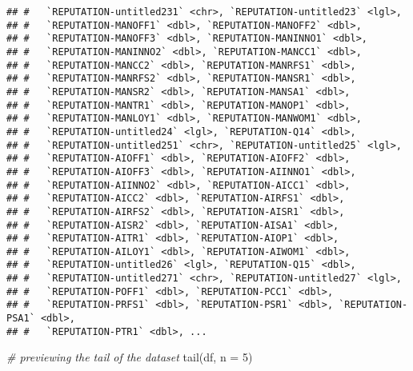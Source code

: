 \documentclass[
]{article}
\newenvironment{Shaded}{\begin{snugshade}}{\end{snugshade}}
\newcommand{\AttributeTok}[1]{\textcolor[rgb]{0.77,0.63,0.00}{#1}}
\newcommand{\CommentTok}[1]{\textcolor[rgb]{0.56,0.35,0.01}{\textit{#1}}}
\newcommand{\DecValTok}[1]{\textcolor[rgb]{0.00,0.00,0.81}{#1}}
\newcommand{\FunctionTok}[1]{\textcolor[rgb]{0.00,0.00,0.00}{#1}}
\newcommand{\NormalTok}[1]{#1}
\begin{document}
\begin{verbatim}
## #   `REPUTATION-untitled231` <chr>, `REPUTATION-untitled23` <lgl>,
## #   `REPUTATION-MANOFF1` <dbl>, `REPUTATION-MANOFF2` <dbl>,
## #   `REPUTATION-MANOFF3` <dbl>, `REPUTATION-MANINNO1` <dbl>,
## #   `REPUTATION-MANINNO2` <dbl>, `REPUTATION-MANCC1` <dbl>,
## #   `REPUTATION-MANCC2` <dbl>, `REPUTATION-MANRFS1` <dbl>,
## #   `REPUTATION-MANRFS2` <dbl>, `REPUTATION-MANSR1` <dbl>,
## #   `REPUTATION-MANSR2` <dbl>, `REPUTATION-MANSA1` <dbl>,
## #   `REPUTATION-MANTR1` <dbl>, `REPUTATION-MANOP1` <dbl>,
## #   `REPUTATION-MANLOY1` <dbl>, `REPUTATION-MANWOM1` <dbl>,
## #   `REPUTATION-untitled24` <lgl>, `REPUTATION-Q14` <dbl>,
## #   `REPUTATION-untitled251` <chr>, `REPUTATION-untitled25` <lgl>,
## #   `REPUTATION-AIOFF1` <dbl>, `REPUTATION-AIOFF2` <dbl>,
## #   `REPUTATION-AIOFF3` <dbl>, `REPUTATION-AIINNO1` <dbl>,
## #   `REPUTATION-AIINNO2` <dbl>, `REPUTATION-AICC1` <dbl>,
## #   `REPUTATION-AICC2` <dbl>, `REPUTATION-AIRFS1` <dbl>,
## #   `REPUTATION-AIRFS2` <dbl>, `REPUTATION-AISR1` <dbl>,
## #   `REPUTATION-AISR2` <dbl>, `REPUTATION-AISA1` <dbl>,
## #   `REPUTATION-AITR1` <dbl>, `REPUTATION-AIOP1` <dbl>,
## #   `REPUTATION-AILOY1` <dbl>, `REPUTATION-AIWOM1` <dbl>,
## #   `REPUTATION-untitled26` <lgl>, `REPUTATION-Q15` <dbl>,
## #   `REPUTATION-untitled271` <chr>, `REPUTATION-untitled27` <lgl>,
## #   `REPUTATION-POFF1` <dbl>, `REPUTATION-PCC1` <dbl>,
## #   `REPUTATION-PRFS1` <dbl>, `REPUTATION-PSR1` <dbl>, `REPUTATION-PSA1` <dbl>,
## #   `REPUTATION-PTR1` <dbl>, ...
\end{verbatim}

\begin{Shaded}
\begin{Highlighting}[]
\CommentTok{\# previewing the tail of the dataset}
\FunctionTok{tail}\NormalTok{(df, }\AttributeTok{n =} \DecValTok{5}\NormalTok{)}
\end{Highlighting}
\end{Shaded}
\end{document}
